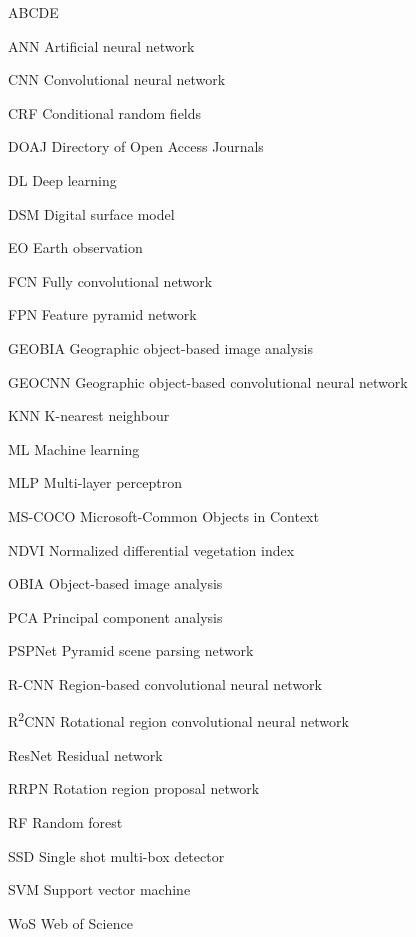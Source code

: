 
\begin{seznamzkratek}{ABCDE}

	      {ANN}
	      {Artificial neural network}

	      {CNN}
	      {Convolutional neural network}

	      {CRF}
	      {Conditional random fields}

	      {DOAJ}
	      {Directory of Open Access Journals}

	      {DL}
	      {Deep learning}

	      {DSM}
	      {Digital surface model}

	      {EO}
	      {Earth observation}

	      {FCN}
	      {Fully convolutional network}

	      {FPN}
	      {Feature pyramid network}

	      {GEOBIA}
	      {Geographic object-based image analysis}

	      {GEOCNN}
	      {Geographic object-based convolutional neural network}

	      {KNN}
	      {K-nearest neighbour}

	      {ML}
	      {Machine learning}

	      {MLP}
	      {Multi-layer perceptron}

	      {MS-COCO}
	      {Microsoft-Common Objects in Context}

	      {NDVI}
	      {Normalized differential vegetation index}

	      {OBIA}
	      {Object-based image analysis}

	      {PCA}
	      {Principal component analysis}

	      {PSPNet}
	      {Pyramid scene parsing network}

	      {R-CNN}
	      {Region-based convolutional neural network}

	      {R\textsuperscript{2}CNN}
	      {Rotational region convolutional neural network}

	      {ResNet}
	      {Residual network}

	      {RRPN}
	      {Rotation region proposal network}

	      {RF}
	      {Random forest}

	      {SSD}
	      {Single shot multi-box detector}

	      {SVM}
	      {Support vector machine}

	      {WoS}
	      {Web of Science}
	      
\end{seznamzkratek}